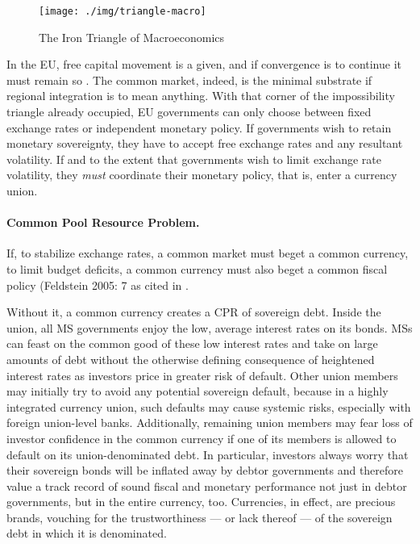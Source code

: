 \documentclass[11pt,a4paper,oneside]{article}
\begin{document}
 \begin{figure}[htbp]
	\centering
	\texttt{[image: ./img/triangle-macro]}  
	\caption{The Iron Triangle of Macroeconomics}
	\label{fig:triangle-macro}
\end{figure} 

In the \gls{EU}, free capital movement is a given, and if convergence is to continue it must remain so \citep{Abiad2007}. 
The common market, indeed, is the minimal substrate if regional integration is to mean anything. 
With that corner of the impossibility triangle already occupied, \gls{EU} governments can only choose between fixed exchange rates or independent monetary policy. 
If governments wish to retain monetary sovereignty, they have to accept free exchange rates and any resultant volatility. 
If and to the extent that governments wish to limit exchange rate volatility, they \emph{must} coordinate their monetary policy, that is, enter a currency union.

\paragraph[Fiscal-CPR]{Common Pool Resource Problem.}  \label{sec:fiscal-CPR} If, to stabilize exchange rates, a common market must beget a common currency, to limit budget deficits, a common currency must also beget a common fiscal policy (Feldstein 2005: 7 as cited in \citep[13]{Begg2008}. 

Without it, a common currency creates a \gls{CPR} of sovereign debt. 
Inside the union, all \gls{MS} governments enjoy the low, average interest rates on its bonds. 
\glspl{MS} can feast on the common good of these low interest rates and take on large amounts of debt without the otherwise defining consequence of heightened interest rates as investors price in greater risk of default. %
Other union members may initially try to avoid any potential sovereign default, because in a highly integrated currency union, such defaults may cause systemic risks, especially with foreign union-level banks. 
Additionally, remaining union members may fear loss of investor confidence in the common currency if one of its members is allowed to default on its union-denominated debt. 
In particular, investors always worry that their sovereign bonds will be inflated away by debtor governments and therefore value a track record of sound fiscal and monetary performance not just in debtor governments, but in the entire currency, too. 
Currencies, in effect, are precious brands, vouching for the trustworthiness --- or lack thereof --- of the sovereign debt in which it is denominated.
\end{document}

